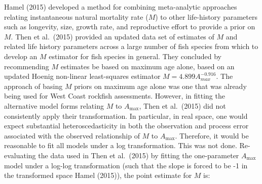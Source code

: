 \documentclass[11pt,
  english,
  letterpaper,
]{article}
\begin{document}
Hamel {(2015)\leavevmode\tagmcend\tagstructend} developed a method for combining meta-analytic approaches relating instantaneous natural mortality rate ({\(M\)\leavevmode\tagmcend\tagstructend}) to other life-history parameters such as longevity, size, growth rate, and reproductive effort to provide a prior on {\(M\)\leavevmode\tagmcend\tagstructend}. Then et al.~{(2015)\leavevmode\tagmcend\tagstructend} provided an updated data set of estimates of {\(M\)\leavevmode\tagmcend\tagstructend} and related life history parameters across a large number of fish species from which to develop an {\(M\)\leavevmode\tagmcend\tagstructend} estimator for fish species in general. They concluded by recommending {\(M\)\leavevmode\tagmcend\tagstructend} estimates be based on maximum age alone, based on an updated Hoenig non-linear least-squares estimator {\(M=4.899A^{-0.916}_{max}\)\leavevmode\tagmcend\tagstructend}. The approach of basing {\(M\)\leavevmode\tagmcend\tagstructend} priors on maximum age alone was one that was already being used for West Coast rockfish assessments. However, in fitting the alternative model forms relating {\(M\)\leavevmode\tagmcend\tagstructend} to {\(A_{\text{max}}\)\leavevmode\tagmcend\tagstructend}, Then et al.~{(2015)\leavevmode\tagmcend\tagstructend} did not consistently apply their transformation. In particular, in real space, one would expect substantial heteroscedasticity in both the observation and process error associated with the observed relationship of {\(M\)\leavevmode\tagmcend\tagstructend} to {\(A_{\text{max}}\)\leavevmode\tagmcend\tagstructend}. Therefore, it would be reasonable to fit all models under a log transformation. This was not done. Re-evaluating the data used in Then et al.~{(2015)\leavevmode\tagmcend\tagstructend} by fitting the one-parameter {\(A_{\text{max}}\)\leavevmode\tagmcend\tagstructend} model under a log-log transformation (such that the slope is forced to be -1 in the transformed space Hamel {(2015)\leavevmode\tagmcend\tagstructend}), the point estimate for {\(M\)\leavevmode\tagmcend\tagstructend} is:
\end{document}
